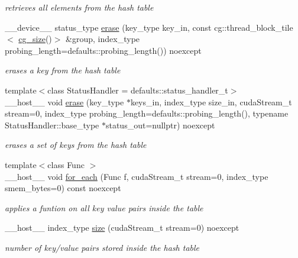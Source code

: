 \begin{DoxyCompactItemize}
\begin{DoxyCompactList}\small\item\em retrieves all elements from the hash table \end{DoxyCompactList}\item 
\+\_\+\+\_\+device\+\_\+\+\_\+ status\+\_\+type \hyperlink{classwarpcore_1_1CountingHashTable_aee43cc21c75f1ad37e79604afa034363}{erase} (key\+\_\+type key\+\_\+in, const cg\+::thread\+\_\+block\+\_\+tile$<$ \hyperlink{classwarpcore_1_1CountingHashTable_aeaf1b333eb176da987dee4d003e5dddc}{cg\+\_\+size}()$>$ \&group, index\+\_\+type probing\+\_\+length=defaults\+::probing\+\_\+length()) noexcept
\begin{DoxyCompactList}\small\item\em erases a key from the hash table \end{DoxyCompactList}\item 
{\footnotesize template$<$class Status\+Handler  = defaults\+::status\+\_\+handler\+\_\+t$>$ }\\\+\_\+\+\_\+host\+\_\+\+\_\+ void \hyperlink{classwarpcore_1_1CountingHashTable_a1f321a68311d1a0e9994947f9995e07c}{erase} (key\+\_\+type $\ast$keys\+\_\+in, index\+\_\+type size\+\_\+in, cuda\+Stream\+\_\+t stream=0, index\+\_\+type probing\+\_\+length=defaults\+::probing\+\_\+length(), typename Status\+Handler\+::base\+\_\+type $\ast$status\+\_\+out=nullptr) noexcept
\begin{DoxyCompactList}\small\item\em erases a set of keys from the hash table \end{DoxyCompactList}\item 
{\footnotesize template$<$class Func $>$ }\\\+\_\+\+\_\+host\+\_\+\+\_\+ void \hyperlink{classwarpcore_1_1CountingHashTable_aea11af31c41fe5d7369b42f2b74d276a}{for\+\_\+each} (Func f, cuda\+Stream\+\_\+t stream=0, index\+\_\+type smem\+\_\+bytes=0) const noexcept
\begin{DoxyCompactList}\small\item\em applies a funtion on all key value pairs inside the table \end{DoxyCompactList}\item 
\+\_\+\+\_\+host\+\_\+\+\_\+ index\+\_\+type \hyperlink{classwarpcore_1_1CountingHashTable_a3ea12f2cb1fb21743f91014b78221321}{size} (cuda\+Stream\+\_\+t stream=0) noexcept
\begin{DoxyCompactList}\small\item\em number of key/value pairs stored inside the hash table \end{DoxyCompactList}\item 

\end{DoxyCompactItemize}
